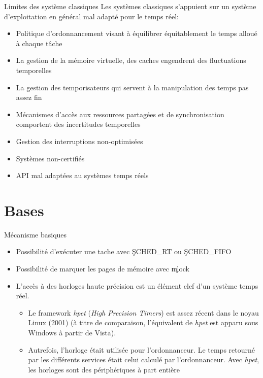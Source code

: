 \begin{frame}{Limites des système classiques}
  Les systèmes classiques s'appuient  sur un système d'exploitation en
  général mal adapté pour le temps réel:
  \begin{itemize}
  \item Politique d'ordonnancement visant à équilibrer équitablement le
    temps alloué à chaque tâche
  \item La gestion de la  mémoire virtuelle, des caches engendrent des
    fluctuations temporelles
  \item La  gestion des temporisateurs  qui servent à  la manipulation
    des temps pas assez fin
  \item   Mécanismes   d'accès   aux   ressources  partagées   et   de
    synchronisation comportent des incertitudes temporelles
  \item Gestion des interruptions non-optimisées
  \item Systèmes non-certifiés
  \item API mal adaptées au systèmes temps réels
  \end{itemize}
\end{frame}

\section{Bases}

\begin{frame}{Mécanisme basiques}
  \begin{itemize}
  \item  Possibilité  d'exécuter  une  tache avec  \c{SCHED_RT}  ou
    \c{SCHED_FIFO}
  \item Possibilité de marquer les pages de mémoire avec \c{mlock}
  \item L'accès  à des  horloges haute précision  est un  élément clef
    d'un système temps réel.
    \begin{itemize}
    \item Le framework  \emph{hpet} (\emph{High Precision Timers}) est
      assez récent dans le noyau Linux (2001) (à titre de comparaison,
      l'équivalent de \emph{hpet} est  apparu sous Windows à partir de
      Vista).
    \item Autrefois, l'horloge  était utilisée pour l'ordonnanceur. Le
      temps retourné  par les différents services  était celui calculé
      par l'ordonnanceur.   Avec \emph{hpet}, les  horloges sont des
      périphériques à part entière
    \end{itemize}
  \end{itemize}
\end{frame}

